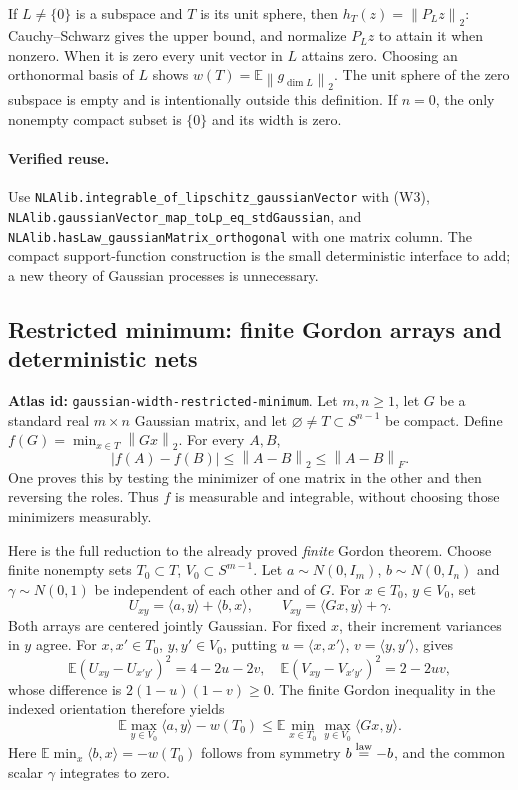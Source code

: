 \documentclass[11pt,a4paper]{article}
\newcommand{\norm}[1]{\left\lVert#1\right\rVert}
\DeclareRobustCommand{\code}[1]{{\footnotesize\urlstyle{tt}\nolinkurl{#1}}}
\begin{document}
If $L\ne\{0\}$ is a subspace and $T$ is its unit sphere, then
$h_T(z)=\norm{P_Lz}_2$: Cauchy--Schwarz gives the upper bound, and normalize
$P_Lz$ to attain it when nonzero. When it is zero every unit vector in $L$
attains zero. Choosing an orthonormal basis of $L$ shows
$w(T)=\mathbb E\norm{g_{\dim L}}_2$. The unit sphere of the zero subspace
is empty and is intentionally outside this definition. If $n=0$, the only
nonempty compact subset is $\{0\}$ and its width is zero.

\paragraph{Verified reuse.}
Use \code{NLAlib.integrable_of_lipschitz_gaussianVector} with (W3),
\code{NLAlib.gaussianVector_map_toLp_eq_stdGaussian}, and
\code{NLAlib.hasLaw_gaussianMatrix_orthogonal} with one matrix column.
The compact support-function construction is the small deterministic
interface to add; a new theory of Gaussian processes is unnecessary.

\subsection{Restricted minimum: finite Gordon arrays and deterministic nets}
\label{route:gaussian-width-restricted-minimum}
\textbf{Atlas id:} \code{gaussian-width-restricted-minimum}.
Let $m,n\ge1$, let $G$ be a standard real $m\times n$ Gaussian matrix,
and let $\varnothing\ne T\subset S^{n-1}$ be compact. Define
$f(G)=\min_{x\in T}\norm{Gx}_2$. For every $A,B$,
\[
 |f(A)-f(B)|\le\norm{A-B}_2\le\norm{A-B}_F.             \tag{W5}
\]
One proves this by testing the minimizer of one matrix in the other and
then reversing the roles. Thus $f$ is measurable and integrable, without
choosing those minimizers measurably.

Here is the full reduction to the already proved \emph{finite} Gordon
theorem. Choose finite nonempty sets $T_0\subset T$, $V_0\subset S^{m-1}$.
Let $a\sim N(0,I_m)$, $b\sim N(0,I_n)$ and $\gamma\sim N(0,1)$ be
independent of each other and of $G$. For $x\in T_0$, $y\in V_0$, set
\[
 U_{xy}=\langle a,y\rangle+\langle b,x\rangle,\qquad
 V_{xy}=\langle Gx,y\rangle+\gamma.
\]
Both arrays are centered jointly Gaussian. For fixed $x$, their increment
variances in $y$ agree. For $x,x'\in T_0$, $y,y'\in V_0$, putting
$u=\langle x,x'\rangle$, $v=\langle y,y'\rangle$, gives
\[
 \mathbb E(U_{xy}-U_{x'y'})^2=4-2u-2v,\quad
 \mathbb E(V_{xy}-V_{x'y'})^2=2-2uv,
\]
whose difference is $2(1-u)(1-v)\ge0$. The finite Gordon inequality in
the indexed orientation therefore yields
\[
 \mathbb E\max_{y\in V_0}\langle a,y\rangle-w(T_0)
 \le\mathbb E\min_{x\in T_0}\max_{y\in V_0}\langle Gx,y\rangle. \tag{W6}
\]
Here $\mathbb E\min_x\langle b,x\rangle=-w(T_0)$ follows from symmetry
$b\overset{\rm law}=-b$, and the common scalar $\gamma$ integrates to zero.
\end{document}
